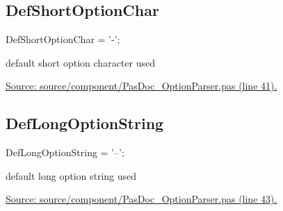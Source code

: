 \documentclass{report}
\newif\ifpdf
\begin{document}
\subsection*{DefShortOptionChar}
\fi
\label{PasDoc_OptionParser-DefShortOptionChar}
\begin{list}{}{
\setlength{\itemindent}{0cm}
\setlength{\listparindent}{0cm}
\setlength{\leftmargin}{\evensidemargin}
\addtolength{\leftmargin}{\tmplength}
\settowidth{\labelsep}{X}
\addtolength{\leftmargin}{\labelsep}
\setlength{\labelwidth}{\tmplength}
}
\item[\textbf{Declaration}\hfill]
\ifpdf
\begin{flushleft}
\fi
\begin{ttfamily}
DefShortOptionChar = '-';\end{ttfamily}

\ifpdf
\end{flushleft}
\fi

\par
\item[\textbf{Description}]
default short option character used\par
\href{https://github.com/pasdoc/pasdoc/blob/master/source/component/PasDoc_OptionParser.pas#L41}{Source: source/component/PasDoc{\_}OptionParser.pas (line 41).}

\end{list}
\ifpdf
\subsection*{\large{\textbf{DefLongOptionString}}\normalsize\hspace{1ex}\hrulefill}
\else
\subsection*{DefLongOptionString}
\fi
\label{PasDoc_OptionParser-DefLongOptionString}
\begin{list}{}{
\setlength{\itemindent}{0cm}
\setlength{\listparindent}{0cm}
\setlength{\leftmargin}{\evensidemargin}
\addtolength{\leftmargin}{\tmplength}
\settowidth{\labelsep}{X}
\addtolength{\leftmargin}{\labelsep}
\setlength{\labelwidth}{\tmplength}
}
\item[\textbf{Declaration}\hfill]
\ifpdf
\begin{flushleft}
\fi
\begin{ttfamily}
DefLongOptionString = '--';\end{ttfamily}

\ifpdf
\end{flushleft}
\fi

\par
\item[\textbf{Description}]
default long option string used\par
\href{https://github.com/pasdoc/pasdoc/blob/master/source/component/PasDoc_OptionParser.pas#L43}{Source: source/component/PasDoc{\_}OptionParser.pas (line 43).}

\end{list}
\ifpdf
\end{document}
